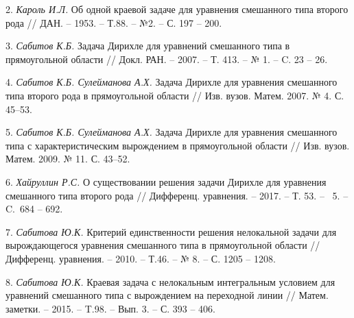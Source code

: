 2. {\it Кароль И.Л.} Об одной краевой задаче для уравнения
смешанного типа второго рода
  // ДАН. -- 1953. -- Т.88. -- №2. -- С. 197 -- 200.

3. {\it Сабитов К.Б.} Задача Дирихле для уравнений смешанного
типа в прямоугольной области // Докл. РАН. -- 2007. -- Т. 413. --
№ 1. -- C. 23 -- 26.

4. {\it Сабитов К.Б. Сулейманова А.Х.} Задача Дирихле для уравнения смешанного типа второго рода в прямоугольной области // Изв. вузов. Матем. 2007. № 4. С. 45--53.

5. {\it Сабитов К.Б. Сулейманова А.Х.} Задача Дирихле для уравнения смешанного типа с характеристическим вырождением в прямоугольной области // Изв. вузов. Матем. 2009. № 11. С. 43--52.

6. {\it Хайруллин Р.С.} О существовании решения задачи Дирихле
для уравнения смешанного типа второго рода
// Дифференц. уравнения. -- 2017. -- Т. 53. -- \No~5. -- C.~684 -- 692.

7. {\it Сабитова Ю.К.} Критерий единственности решения
нелокальной задачи для вырождающегося уравнения смешанного типа в
прямоугольной области // Дифференц. уравнения. -- 2010. -- Т.46.
-- № 8. -- С. 1205 -- 1208.

8. {\it Сабитова Ю.К.} Краевая задача с нелокальным интегральным
условием для уравнений смешанного типа с вырождением на переходной
линии // Матем. заметки. -- 2015. -- T.98. -- Вып. 3. -- С. 393 --
406.
